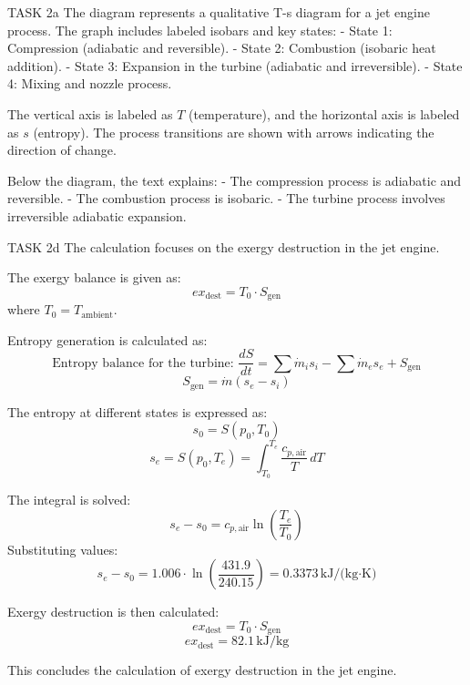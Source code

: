 TASK 2a  
The diagram represents a qualitative T-s diagram for a jet engine process. The graph includes labeled isobars and key states:  
- State 1: Compression (adiabatic and reversible).  
- State 2: Combustion (isobaric heat addition).  
- State 3: Expansion in the turbine (adiabatic and irreversible).  
- State 4: Mixing and nozzle process.  

The vertical axis is labeled as \( T \) (temperature), and the horizontal axis is labeled as \( s \) (entropy). The process transitions are shown with arrows indicating the direction of change.  

Below the diagram, the text explains:  
- The compression process is adiabatic and reversible.  
- The combustion process is isobaric.  
- The turbine process involves irreversible adiabatic expansion.  

TASK 2d  
The calculation focuses on the exergy destruction in the jet engine.  

The exergy balance is given as:  
\[
ex_{\text{dest}} = T_0 \cdot S_{\text{gen}}
\]  
where \( T_0 = T_{\text{ambient}} \).  

Entropy generation is calculated as:  
\[
\text{Entropy balance for the turbine: }  
\frac{dS}{dt} = \sum \dot{m}_i s_i - \sum \dot{m}_e s_e + S_{\text{gen}}
\]  
\[
S_{\text{gen}} = \dot{m} (s_e - s_i)
\]  

The entropy at different states is expressed as:  
\[
s_0 = S(p_0, T_0)  
\]  
\[
s_e = S(p_0, T_e) = \int_{T_0}^{T_e} \frac{c_{p,\text{air}}}{T} \, dT  
\]  

The integral is solved:  
\[
s_e - s_0 = c_{p,\text{air}} \ln \left( \frac{T_e}{T_0} \right)  
\]  
Substituting values:  
\[
s_e - s_0 = 1.006 \cdot \ln \left( \frac{431.9}{240.15} \right) = 0.3373 \, \text{kJ/(kg·K)}  
\]  

Exergy destruction is then calculated:  
\[
ex_{\text{dest}} = T_0 \cdot S_{\text{gen}}  
\]  
\[
ex_{\text{dest}} = 82.1 \, \text{kJ/kg}  
\]  

This concludes the calculation of exergy destruction in the jet engine.